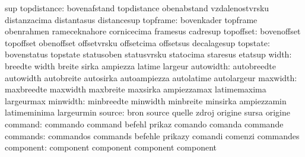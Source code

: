                            sup
              topdistance: bovenafstand              topdistance
                           obenabstand               vzdalenostvrsku
                           distanzacima              distantasus
                           distancesup
                 topframe: bovenkader                topframe
                           obenrahmen                rameceknahore
                           cornicecima               framesus
                           cadresup
                topoffset: bovenoffset               topoffset
                           obenoffset                offsetvrsku
                           offsetcima                offsetsus
                           decalagesup
                 topstate: bovenstatus               topstate
                           statusoben                statusvrsku
                           statocima                 staresus
                           etatsup
                    width: breedte                   width
                           breite                    sirka
                           ampiezza                  latime
                           largeur
                autowidth: autobreedte               autowidth
                           autobreite                autosirka
                           autoampiezza              autolatime
                           autolargeur
                 maxwidth: maxbreedte                maxwidth
                           maxbreite                 maxsirka
                           ampiezzamax               latimemaxima
                           largeurmax
                 minwidth: minbreedte                minwidth
                           minbreite                 minsirka
                           ampiezzamin               latimeminima
                           largeurmin
                   source: bron                      source
                           quelle                    zdroj
                           origine                   sursa
                           origine
                  command: commando                  command
                           befehl                    prikaz
                           comando                   comanda
                           commande
                 commands: commandos                 commands
                           befehle                   prikazy
                           comandi                   comenzi
                           commandes
                component: component                 component
                           component                 component
